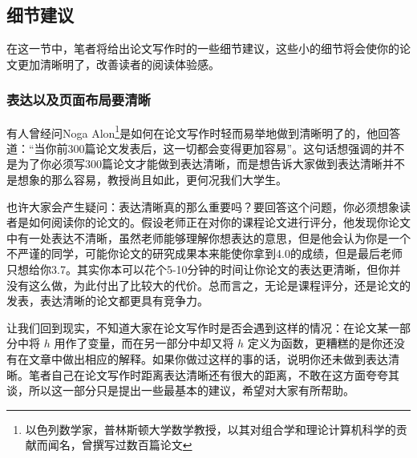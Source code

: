\documentclass{formatBook}
\begin{document}
\subsection{细节建议}
在这一节中，笔者将给出论文写作时的一些细节建议，这些小的细节将会使你的论文更加清晰明了，改善读者的阅读体验感。
\subsubsection{表达以及页面布局要清晰}
有人曾经问Noga Alon\footnote{以色列数学家，普林斯顿大学数学教授，以其对组合学和理论计算机科学的贡献而闻名，曾撰写过数百篇论文}是如何在论文写作时轻而易举地做到清晰明了的，他回答道：“当你前300篇论文发表后，这一切都会变得更加容易”\cite{pak_how_nodate}。这句话想强调的并不是为了你必须写300篇论文才能做到表达清晰，而是想告诉大家做到表达清晰并不是想象的那么容易，教授尚且如此，更何况我们大学生。\par
也许大家会产生疑问：表达清晰真的那么重要吗？要回答这个问题，你必须想象读者是如何阅读你的论文的。假设老师正在对你的课程论文进行评分，他发现你论文中有一处表达不清晰，虽然老师能够理解你想表达的意思，但是他会认为你是一个不严谨的同学，可能你论文的研究成果本来能使你拿到4.0的成绩，但是最后老师只想给你3.7。其实你本可以花个5-10分钟的时间让你论文的表达更清晰，但你并没有这么做，为此付出了比较大的代价。总而言之，无论是课程评分，还是论文的发表，表达清晰的论文都更具有竞争力。\par
让我们回到现实，不知道大家在论文写作时是否会遇到这样的情况：在论文某一部分中将 $h$ 用作了变量，而在另一部分中却又将 $h$ 定义为函数，更糟糕的是你还没有在文章中做出相应的解释。如果你做过这样的事的话，说明你还未做到表达清晰。笔者自己在论文写作时距离表达清晰还有很大的距离，不敢在这方面夸夸其谈，所以这一部分只是提出一些最基本的建议，希望对大家有所帮助。
\end{document}
